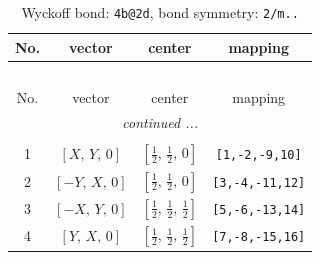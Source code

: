 \documentclass[fleqn,8pt]{jsarticle}
\begin{document}
\begin{longtable}{cccc}
\caption{Wyckoff bond: {\tt 4b@2d}, bond symmetry: {\tt 2/m..}}
 \\
 \hline \hline
No. & vector & center & mapping \\ \hline \endfirsthead

\multicolumn{3}{l}{\tablename\ \thetable{}} \\
 \hline \hline
No. & vector & center & mapping \\ \hline \endhead

 \hline \hline
\multicolumn{3}{r}{\footnotesize\it continued ...} \\ \endfoot

 \hline \hline
\multicolumn{3}{r}{} \\ \endlastfoot

1 & $\left[ X,\, Y,\, 0 \right]$ & $\left[ \frac{1}{2},\, \frac{1}{2},\, 0 \right]$ & {\tt [1,-2,-9,10]} \\ \hline
2 & $\left[ - Y,\, X,\, 0 \right]$ & $\left[ \frac{1}{2},\, \frac{1}{2},\, 0 \right]$ & {\tt [3,-4,-11,12]} \\ \hline
3 & $\left[ - X,\, Y,\, 0 \right]$ & $\left[ \frac{1}{2},\, \frac{1}{2},\, \frac{1}{2} \right]$ & {\tt [5,-6,-13,14]} \\ \hline
4 & $\left[ Y,\, X,\, 0 \right]$ & $\left[ \frac{1}{2},\, \frac{1}{2},\, \frac{1}{2} \right]$ & {\tt [7,-8,-15,16]} \\
\end{longtable}
\renewcommand{\arraystretch}{1.2}
\end{document}
